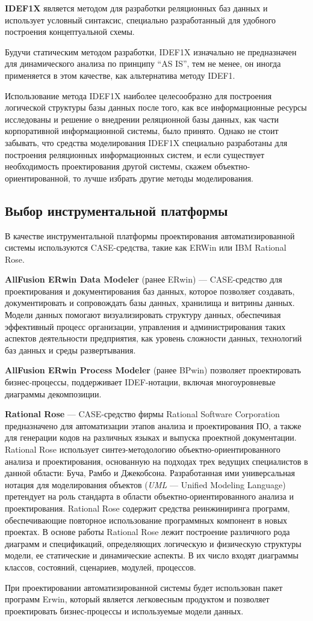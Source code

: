 \textbf{IDEF1X} является методом для разработки реляционных баз данных и
использует условный синтаксис, специально разработанный для удобного
построения концептуальной схемы.

Будучи статическим методом разработки, IDEF1X изначально не
предназначен для динамического анализа по принципу ``AS IS'', тем не менее,
он иногда применяется в этом качестве, как альтернатива методу IDEF1.

Использование метода IDEF1X наиболее целесообразно для построения
логической структуры базы данных после того, как все информационные
ресурсы исследованы и решение о
внедрении реляционной базы данных, как части корпоративной
информационной системы, было принято.
Однако не стоит забывать, что
средства моделирования IDEF1X специально разработаны для построения
реляционных информационных систем, и если существует необходимость
проектирования другой системы, скажем объектно-ориентированной, то
лучше избрать другие методы моделирования.


\pagebreak
\subsection{Выбор инструментальной платформы}
 
В качестве инструментальной платформы проектирования автоматизированной
системы используются CASE-средства, такие как ERWin или
IBM Rational Rose.

\textbf{AllFusion ERwin Data Modeler} (ранее ERwin) --- CASE-средство
для проектирования и документирования баз данных, которое позволяет создавать,
документировать и сопровождать базы данных, хранилища и витрины данных.
Модели данных помогают визуализировать структуру данных,
обеспечивая эффективный процесс организации, управления и администрирования
таких аспектов деятельности предприятия, как уровень сложности данных,
технологий баз данных и среды развертывания.

\textbf{AllFusion ERwin Process Modeler} (ранее BPwin) позволяет
проектировать бизнес-процессы, поддерживает IDEF-нотации, включая
многоуровневые диаграммы декомпозиции. 

\textbf{Rational Rose} --- CASE-средство фирмы Rational Software
Corporation предназначено для автоматизации этапов анализа и
проектирования ПО, а также для генерации кодов на различных
языках и выпуска проектной документации. Rational Rose использует
синтез-методологию объектно-ориентированного анализа и проектирования,
основанную на подходах трех ведущих специалистов в данной области:
Буча, Рамбо и Джекобсона. Разработанная ими универсальная нотация
для моделирования объектов (\textit{UML} --- Unified Modeling Language)
претендует на роль стандарта в области объектно-ориентированного
анализа и проектирования. Rational Rose содержит средства
реинжиниринга программ, обеспечивающие повторное использование
программных компонент в новых проектах.
В основе работы Rational Rose лежит построение различного
рода диаграмм и спецификаций, определяющих логическую и
физическую структуры модели, ее статические и динамические аспекты.
В их число входят диаграммы классов, состояний, сценариев, модулей, процессов.

При проектировании автоматизированной системы будет использован
пакет программ Erwin, который является легковесным продуктом и
позволяет проектировать бизнес-процессы и используемые модели
данных.